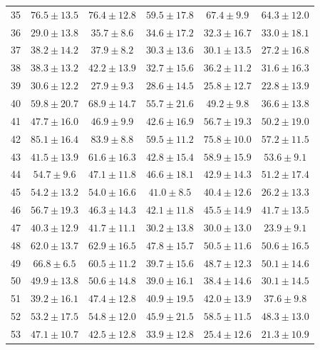 \begin{tabular}{lccccc}
35 & $\mathbf{76.5} \pm 13.5$ & $76.4 \pm 12.8$ & $59.5 \pm 17.8$ & $67.4 \pm 9.9$ & $64.3 \pm 12.0$ \\
36 & $29.0 \pm 13.8$ & $\mathbf{35.7} \pm 8.6$ & $34.6 \pm 17.2$ & $32.3 \pm 16.7$ & $33.0 \pm 18.1$ \\
37 & $\mathbf{38.2} \pm 14.2$ & $37.9 \pm 8.2$ & $30.3 \pm 13.6$ & $30.1 \pm 13.5$ & $27.2 \pm 16.8$ \\
38 & $38.3 \pm 13.2$ & $\mathbf{42.2} \pm 13.9$ & $32.7 \pm 15.6$ & $36.2 \pm 11.2$ & $31.6 \pm 16.3$ \\
39 & $\mathbf{30.6} \pm 12.2$ & $27.9 \pm 9.3$ & $28.6 \pm 14.5$ & $25.8 \pm 12.7$ & $22.8 \pm 13.9$ \\
40 & $59.8 \pm 20.7$ & $\mathbf{68.9} \pm 14.7$ & $55.7 \pm 21.6$ & $49.2 \pm 9.8$ & $36.6 \pm 13.8$ \\
41 & $47.7 \pm 16.0$ & $46.9 \pm 9.9$ & $42.6 \pm 16.9$ & $\mathbf{56.7} \pm 19.3$ & $50.2 \pm 19.0$ \\
42 & $\mathbf{85.1} \pm 16.4$ & $83.9 \pm 8.8$ & $59.5 \pm 11.2$ & $75.8 \pm 10.0$ & $57.2 \pm 11.5$ \\
43 & $41.5 \pm 13.9$ & $\mathbf{61.6} \pm 16.3$ & $42.8 \pm 15.4$ & $58.9 \pm 15.9$ & $53.6 \pm 9.1$ \\
44 & $\mathbf{54.7} \pm 9.6$ & $47.1 \pm 11.8$ & $46.6 \pm 18.1$ & $42.9 \pm 14.3$ & $51.2 \pm 17.4$ \\
45 & $\mathbf{54.2} \pm 13.2$ & $54.0 \pm 16.6$ & $41.0 \pm 8.5$ & $40.4 \pm 12.6$ & $26.2 \pm 13.3$ \\
46 & $\mathbf{56.7} \pm 19.3$ & $46.3 \pm 14.3$ & $42.1 \pm 11.8$ & $45.5 \pm 14.9$ & $41.7 \pm 13.5$ \\
47 & $40.3 \pm 12.9$ & $\mathbf{41.7} \pm 11.1$ & $30.2 \pm 13.8$ & $30.0 \pm 13.0$ & $23.9 \pm 9.1$ \\
48 & $62.0 \pm 13.7$ & $\mathbf{62.9} \pm 16.5$ & $47.8 \pm 15.7$ & $50.5 \pm 11.6$ & $50.6 \pm 16.5$ \\
49 & $\mathbf{66.8} \pm 6.5$ & $60.5 \pm 11.2$ & $39.7 \pm 15.6$ & $48.7 \pm 12.3$ & $50.1 \pm 14.6$ \\
50 & $49.9 \pm 13.8$ & $\mathbf{50.6} \pm 14.8$ & $39.0 \pm 16.1$ & $38.4 \pm 14.6$ & $30.1 \pm 14.5$ \\
51 & $39.2 \pm 16.1$ & $\mathbf{47.4} \pm 12.8$ & $40.9 \pm 19.5$ & $42.0 \pm 13.9$ & $37.6 \pm 9.8$ \\
52 & $53.2 \pm 17.5$ & $54.8 \pm 12.0$ & $45.9 \pm 21.5$ & $\mathbf{58.5} \pm 11.5$ & $48.3 \pm 13.0$ \\
53 & $\mathbf{47.1} \pm 10.7$ & $42.5 \pm 12.8$ & $33.9 \pm 12.8$ & $25.4 \pm 12.6$ & $21.3 \pm 10.9$ \\

\end{tabular}
